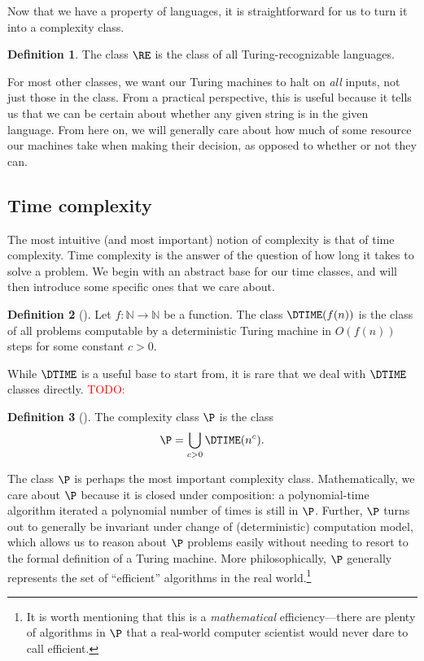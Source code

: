 \documentclass[english,12pt]{reedthesis}
\theoremstyle{plain}
\theoremstyle{definition}
\newtheorem{defn}[defn]{Definition}
\theoremstyle{remark}
\newcommand{\TODO}[1]{\textcolor{red}{TODO: #1}}
\begin{document}
Now that we have a property of languages, it is straightforward for us to turn
it into a complexity class.

\begin{defn}\label{def:re}
  The class $\RE$ is the class of all Turing-recognizable languages.
\end{defn}

For most other classes, we want our Turing machines to halt on \emph{all}
inputs, not just those in the class. From a practical perspective, this is
useful because it tells us that we can be certain about whether any given string
is in the given language. From here on, we will generally care about how much of
some resource our machines take when making their decision, as opposed to
whether or not they can.

\subsection{Time complexity}

The most intuitive (and most important) notion of complexity is that of time
complexity. Time complexity is the answer of the question of how long it takes
to solve a problem. We begin with an abstract base for our time classes, and
will then introduce some specific ones that we care about.

\begin{defn}[{\cite[Def.\ 1.19]{AB09}}]\label{def:dtime}
  Let $f\colon \mathbb{N} \rightarrow \mathbb{N}$ be a function. The class $\DTIME(f(n))$ is the class of all
  problems computable by a deterministic Turing machine in $O(f(n))$ steps for
  some constant $c > 0$.
\end{defn}

While $\DTIME$ is a useful base to start from, it is rare that we deal with
$\DTIME$ classes directly. \TODO{}

\begin{defn}[{\cite[Def.\ 1.20]{AB09}}]\label{def:p}
  The complexity class $\P$ is the class
  \[
    \P = \bigcup_{c > 0}\DTIME(n^{c}).
  \]
\end{defn}

The class $\P$ is perhaps the most important complexity class. Mathematically,
we care about $\P$ because it is closed under composition: a polynomial-time
algorithm iterated a polynomial number of times is still in $\P$. Further, $\P$
turns out to generally be invariant under change of (deterministic) computation
model, which allows us to reason about $\P$ problems easily without needing to
resort to the formal definition of a Turing machine. More philosophically, $\P$
generally represents the set of ``efficient'' algorithms in the real
world.\footnote{It is worth mentioning that this is a \emph{mathematical}
  efficiency---there are plenty of algorithms in $\P$ that a real-world computer
  scientist would never dare to call efficient.}
\end{document}
